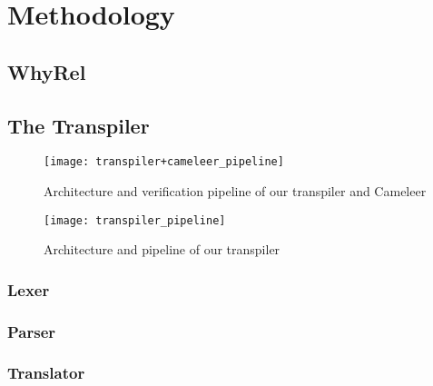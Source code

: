 
%

\chapter{Methodology}
\label{cha:methodology}


\section{WhyRel}
\label{sec:whyrel}



\section{The Transpiler}
\label{sec:transpiler}

\begin{figure}[htbp]
  \centering
  \texttt{[image: transpiler+cameleer\_pipeline]}
  \caption{Architecture and verification pipeline of our transpiler and Cameleer}
  \label{fig:transpiler_cameleer_pipeline}
\end{figure}

\begin{figure}[htbp]
  \centering
  \texttt{[image: transpiler\_pipeline]}
  \caption{Architecture and pipeline of our transpiler}
  \label{fig:transpiler_pipeline}
\end{figure}



\subsection{Lexer}
\label{subsec:lexer}



\subsection{Parser}
\label{subsec:parser}



\subsection{Translator}
\label{subsec:translator}



